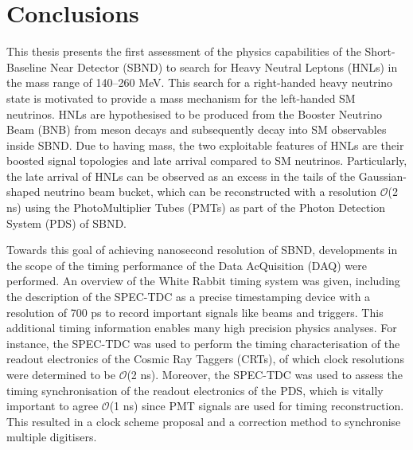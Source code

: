 
\chapter{Conclusions}  %


This thesis presents the first assessment of the physics capabilities of the Short-Baseline Near Detector (SBND) to search for Heavy Neutral Leptons (HNLs) in the mass range of 140--260 MeV.
This search for a right-handed heavy neutrino state is motivated to provide a mass mechanism for the left-handed SM neutrinos.
HNLs are hypothesised to be produced from the Booster Neutrino Beam (BNB) from meson decays and subsequently decay into SM observables inside SBND. 
Due to having mass, the two exploitable features of HNLs are their boosted signal topologies and late arrival compared to SM neutrinos.
Particularly, the late arrival of HNLs can be observed as an excess in the tails of the Gaussian-shaped neutrino beam bucket, which can be reconstructed with a resolution $\mathcal{O}$(2 ns) using the PhotoMultiplier Tubes (PMTs) as part of the Photon Detection System (PDS) of SBND.

Towards this goal of achieving nanosecond resolution of SBND, developments in the scope of the timing performance of the Data AcQuisition (DAQ) were performed.
An overview of the White Rabbit timing system was given, including the description of the SPEC-TDC as a precise timestamping device with a resolution of 700 ps to record important signals like beams and triggers.
This additional timing information enables many high precision physics analyses.
For instance, the SPEC-TDC was used to perform the timing characterisation of the readout electronics of the Cosmic Ray Taggers (CRTs), of which clock resolutions were determined to be $\mathcal{O}$(2 ns).
Moreover, the SPEC-TDC was used to assess the timing synchronisation of the readout electronics of the PDS, which is vitally important to agree $\mathcal{O}$(1 ns) since PMT signals are used for timing reconstruction.
This resulted in a clock scheme proposal and a correction method to synchronise multiple digitisers.

